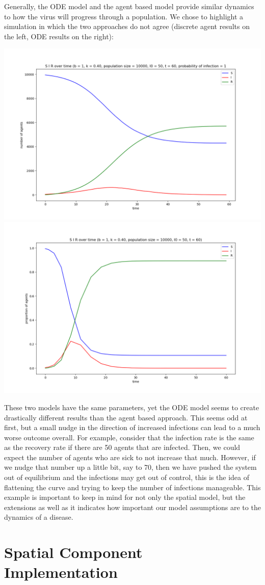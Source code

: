 \documentclass[twoside]{extarticle}                                    %
\numberwithin{equation}{section}                                       %
\begin{document}
Generally, the ODE model and the agent based model provide similar dynamics to how the virus will progress through a population. We chose to highlight a simulation in which the two approaches do not agree (discrete agent results on the left, ODE results on the right):
\begin{center}
    \includegraphics[trim = {3cm 1cm 3cm 1cm}, clip, width = 0.45\linewidth]{../../checkpoint/plots/k40Agent.png} \qquad
    \includegraphics[trim = {3cm 1cm 3cm 1cm}, clip, width = 0.45\linewidth]{../../checkpoint/plots/k40ODE.png}
\end{center}
These two models have the same parameters, yet the ODE model seems to create drastically different results than the agent based approach. This seems odd at first, but a small nudge in the direction of increased infections can lead to a much worse outcome overall. For example, consider that the infection rate is the same as the recovery rate if there are 50 agents that are infected. Then, we could expect the number of agents who are sick to not increase that much. However, if we nudge that number up a little bit, say to 70, then we have pushed the system out of equilibrium and the infections may get out of control, this is the idea of flattening the curve and trying to keep the number of infections manageable. This example is important to keep in mind for not only the spatial model, but the extensions as well as it indicates how important our model assumptions are to the dynamics of a disease.


\section{Spatial Component Implementation}
\end{document}
